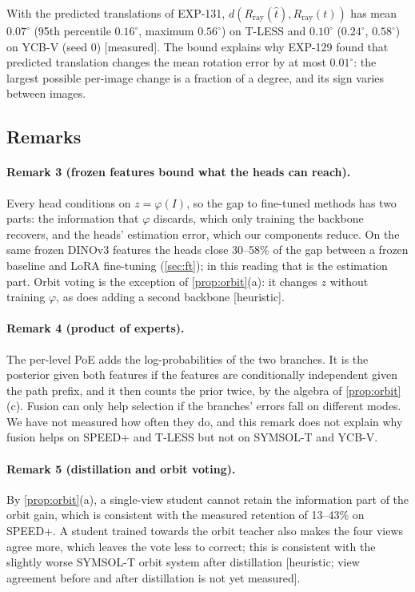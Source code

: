 \noindent With the predicted translations of EXP-131, $d(R_{\mathrm{ray}}(\hat t),R_{\mathrm{ray}}(t))$ has mean $0.07^\circ$
(95th percentile $0.16^\circ$, maximum $0.56^\circ$) on T-LESS and $0.10^\circ$ ($0.24^\circ$, $0.58^\circ$) on YCB-V (seed 0) [measured].
The bound explains why EXP-129 found that predicted translation changes the mean rotation error by at most $0.01^\circ$: the
largest possible per-image change is a fraction of a degree, and its sign varies between images.

\subsection{Remarks}

\paragraph{Remark 3 (frozen features bound what the heads can reach).}
Every head conditions on $z=\varphi(I)$, so the gap to fine-tuned methods has two parts: the information that $\varphi$ discards,
which only training the backbone recovers, and the heads' estimation error, which our components reduce. On the same frozen
DINOv3 features the heads close 30--58\% of the gap between a frozen baseline and LoRA fine-tuning (\cref{sec:ft}); in this
reading that is the estimation part. Orbit voting is the exception of \cref{prop:orbit}(a): it changes $z$ without training $\varphi$, as does adding a second
backbone [heuristic].

\paragraph{Remark 4 (product of experts).}
The per-level PoE adds the log-probabilities of the two branches. It is the posterior given both features if the features are
conditionally independent given the path prefix, and it then counts the prior twice, by the algebra of \cref{prop:orbit}(c).
Fusion can only help selection if the branches' errors fall on different modes. We have not measured how often they do, and this
remark does not explain why fusion helps on SPEED+ and T-LESS but not on SYMSOL-T and YCB-V.

\paragraph{Remark 5 (distillation and orbit voting).}
By \cref{prop:orbit}(a), a single-view student cannot retain the information part of the orbit gain, which is consistent with
the measured retention of 13--43\% on SPEED+. A student trained towards the orbit teacher also makes the four views agree more,
which leaves the vote less to correct; this is consistent with the slightly worse SYMSOL-T orbit system after distillation
[heuristic; view agreement before and after distillation is not yet measured].

